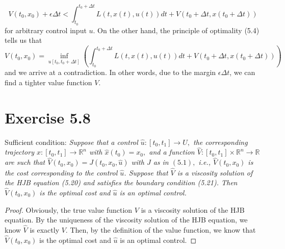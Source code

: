 \documentclass[11pt]{report}
\begin{document}
$$
V\left(t_{0}, x_{0}\right) + \epsilon \Delta t < \int_{t_{0}}^{t_{0}+\Delta t} L\left(t, x(t), u(t)\right) d t+V\left(t_{0}+\Delta t, x\left(t_{0}+\Delta t\right)\right)
$$
for arbitrary control input $u$.
On the other hand, the principle of optimality (5.4) tells us that
$$
V\left(t_{0}, x_{0}\right) = \inf_{u[t_0, t_0+\Delta t]}\left(\int_{t_{0}}^{t_{0}+\Delta t} L\left(t, x(t), u(t)\right) d t+V\left(t_{0}+\Delta t, x\left(t_{0}+\Delta t\right)\right)\right)
$$
and we arrive at a contradiction. In other words, due to the margin $\epsilon \Delta t$, we can find a tighter value function $V$.

\section*{Exercise 5.8}
Sufficient condition: {\em
Suppose that a control $\hat{u}:\left[t_{0}, t_{1}\right] \rightarrow U,$ the corresponding trajectory $\hat{x}:\left[t_{0}, t_{1}\right] \rightarrow \mathbb{R}^{n}$ with $\hat{x}\left(t_{0}\right)=x_{0},$ and a function $\hat{V}:\left[t_{0}, t_{1}\right] \times \mathbb{R}^{n} \rightarrow \mathbb{R}$ are such that $\hat{V}\left(t_{0}, x_{0}\right)=J\left(t_{0}, x_{0}, \hat{u}\right)$ with $J$ as
in $(5.1),$ i.e., $\hat{V}\left(t_{0}, x_{0}\right)$ is the cost corresponding to the control $\hat{u}$. Suppose that $\hat{V}$ is a viscosity solution of the HJB equation (5.20) and satisfies the boundary condition (5.21). Then $\hat{V}\left(t_{0}, x_{0}\right)$ is the optimal cost and $\hat{u}$ is an optimal control.
}
\begin{proof}
Obviously, the true value function $V$ is a viscosity solution of the HJB equation. By the uniqueness of the viscosity solution of the HJB equation, we know $\hat{V}$ is exactly $V$. Then, by the definition of the value function, we know that $\hat{V}\left(t_{0}, x_{0}\right)$ is the optimal cost and $\hat{u}$ is an optimal control.
\end{proof}
\end{document}
